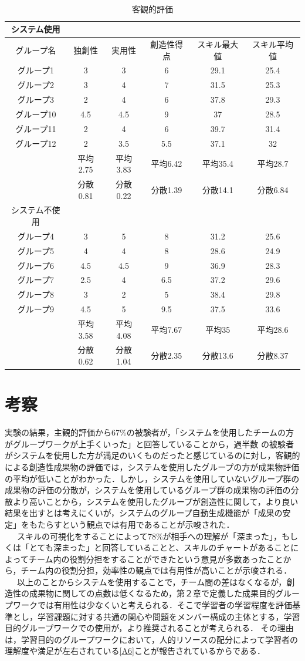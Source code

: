 \documentclass{funthesis}
\begin{document}
\ 
\begin{table}[H]
\begin{center}

  \caption{客観的評価}
  \begin{tabular}{cccccc} \hline
  システム使用\tabularnewline \hline
  グループ名&独創性&実用性&創造性得点
  &スキル最大値 & スキル平均値\tabularnewline \hline
    グループ1&3&3&6&29.1 &25.4\tabularnewline
    グループ2&3&4&7& 31.5&25.3 \tabularnewline
    グループ3&2&4&6 &37.8&29.3\tabularnewline
    グループ10&4.5&4.5&9&37&28.5 \tabularnewline
    グループ11&2&4&6&39.7&31.4 \tabularnewline
    グループ12&2&3.5&5.5&37.1&32 \tabularnewline \hline 
     &平均2.75&平均3.83&平均6.42&平均35.4&平均28.7\tabularnewline
    &分散0.81&分散0.22&分散1.39&分散14.1&分散6.84\tabularnewline 
      \hline \hline 
   システム不使用\tabularnewline \hline 
    グループ4&3&5&8&31.2&25.6 \tabularnewline
    グループ5&4&4&8&28.6&24.9 \tabularnewline
    グループ6&4.5&4.5&9 &36.9&28.3\tabularnewline
    グループ7&2.5&4&6.5&37.2&29.6 \tabularnewline
    グループ8&3&2&5 &38.4&29.8\tabularnewline
    グループ9&4.5&5&9.5&37.5&33.6 \tabularnewline
         \hline
         &平均3.58&平均4.08&平均7.67&平均35&平均28.6\tabularnewline 
    &分散0.62&分散1.04&分散2.35&分散13.6&分散8.37\tabularnewline \hline
  \end{tabular}
  \label{客観的評価}
  \end{center}
\end{table}

\section{考察}
実験の結果，主観的評価から67\%の被験者が，「システムを使用したチームの方がグループワークが上手くいった」と回答していることから，過半数
の被験者がシステムを使用した方が満足のいくものだったと感じているのに対し，客観的による創造性成果物の評価では，システムを使用したグループの方が成果物評価の平均が低いことがわかった．しかし，システムを使用していないグループ群の成果物の評価の分散が，システムを使用しているグループ群の成果物の評価の分散より高いことから，システムを使用したグループが創造性に関して，より良い結果を出すとは考えにくいが，システムのグループ自動生成機能が「成果の安定」をもたらすという観点では有用であることが示唆された．\\
\ \ \ スキルの可視化をすることによって78\%が相手への理解が「深まった」，もしくは「とても深まった」と回答していることと、スキルのチャートがあることによってチーム内の役割分担をすることができたという意見が多数あったことから，チーム内の役割分担，効率性の観点では有用性が高いことが示唆される．\\
\ \ \ 以上のことからシステムを使用することで，チーム間の差はなくなるが，創造性の成果物に関しての点数は低くなるため，第２章で定義した成果目的グループワークでは有用性は少なくいと考えられる．そこで学習者の学習程度を評価基準とし，学習課題に対する共通の関心や問題をメンバー構成の主体とする，学習目的グループワークでの使用が，より推奨されることが考えられる． その理由は，学習目的のグループワークにおいて，人的リソースの配分によって学習者の理解度や満足が左右されている\ref{A6}ことが報告されているからである．
\end{document}
